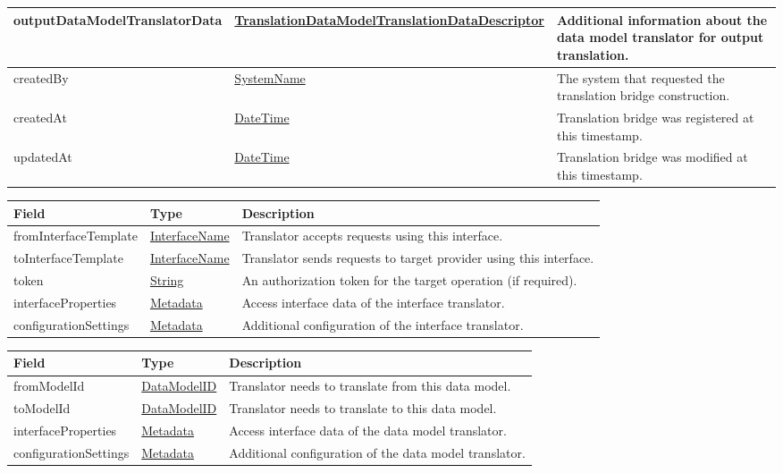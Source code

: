 \documentclass[a4paper]{arrowhead}
\newcommand{\pref}[1]{{\textcolor{ArrowheadGrey}{\hyperref[sec:model:primitives:#1]{#1}}}}
\begin{document}
\begin{table}[ht!]
\begin{tabularx}{\textwidth}{| p{5cm} | p{5.2cm} | X |}
outputDataModelTranslatorData & \hyperref[sec:model:TranslationDataModelTranslationDataDescriptor]{Translation\-Data\-Model\-Translation\-Data\-Descriptor} & Additional information about the data model translator for output translation. \\ \hline
createdBy & \pref{SystemName} & The system that requested the translation bridge construction. \\ \hline
createdAt & \pref{DateTime} & Translation bridge was registered at this timestamp. \\ \hline
updatedAt & \pref{DateTime} & Translation bridge was modified at this timestamp. \\ \hline
\end{tabularx}
\end{table}

\clearpage


\begin{table}[ht!]
\begin{tabularx}{\textwidth}{| p{4.5cm} | p{3.5cm} | X |} \hline
\rowcolor{gray!33} Field & Type      & Description \\ \hline
fromInterfaceTemplate & \pref{InterfaceName} & Translator accepts requests using this interface. \\ \hline
toInterfaceTemplate & \pref{InterfaceName} & Translator sends requests to target provider using this interface. \\ \hline
token & \pref{String} & An authorization token for the target operation (if required). \\ \hline
interfaceProperties &\hyperref[sec:model:Metadata]{Metadata} & Access interface data of the interface translator. \\ \hline
configurationSettings &\hyperref[sec:model:Metadata]{Metadata} & Additional configuration of the interface translator. \\ \hline
\end{tabularx}
\end{table}


\begin{table}[ht!]
\begin{tabularx}{\textwidth}{| p{4.5cm} | p{3.5cm} | X |} \hline
\rowcolor{gray!33} Field & Type      & Description \\ \hline
fromModelId & \pref{DataModelID} & Translator needs to translate from this data model.  \\ \hline
toModelId & \pref{DataModelID} & Translator needs to translate to this data model. \\ \hline
interfaceProperties &\hyperref[sec:model:Metadata]{Metadata} & Access interface data of the data model translator. \\ \hline
configurationSettings &\hyperref[sec:model:Metadata]{Metadata} & Additional configuration of the data model translator. \\ \hline
\end{tabularx}
\end{table}
\end{document}
